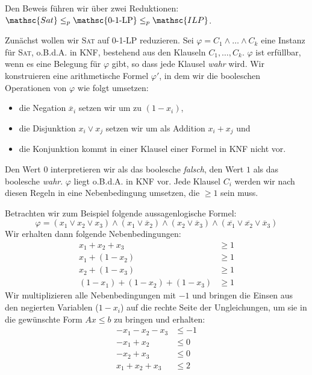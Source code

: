 \begin{Bew}
  \hspace{\parindent}Den Beweis führen wir über zwei Reduktionen: $\mathsc{Sat} \le_p \operatorname{\mathsc{0-1-LP}} \le_p \mathsc{ILP}$.
  
  Zunächst wollen wir \textsc{Sat} auf \textsc{0-1-LP} reduzieren. Sei $\varphi=C_1 \wedge \ldots \wedge C_k$ eine Instanz für \textsc{Sat}, o.B.d.A. in KNF, bestehend aus den Klauseln $C_1, \ldots, C_k$. $\varphi$ ist erfüllbar, wenn es eine Belegung für $\varphi$ gibt, so dass jede Klausel \textit{wahr} wird. Wir konstruieren eine arithmetische Formel $\varphi'$, in dem wir die booleschen Operationen von $\varphi$ wie folgt umsetzen:
  \begin{itemize}
    \item die Negation $\overline{x}_i$ setzen wir um zu $(1-x_i)$,
    \item die Disjunktion $x_i \vee x_j$ setzen wir um als Addition $x_i + x_j$ und
    \item die Konjunktion kommt in einer Klausel einer Formel in KNF nicht vor.
  \end{itemize}
  Den Wert $0$ interpretieren wir als das boolesche \textit{falsch}, den Wert $1$ als das boolesche \textit{wahr}. $\varphi$ liegt o.B.d.A. in KNF vor. Jede Klausel $C_i$ werden wir nach diesen Regeln in eine Nebenbedingung umsetzen, die $\ge 1$ sein muss.
  
  Betrachten wir zum Beispiel folgende aussagenlogische Formel:
  \[ \varphi = (x_1 \vee x_2 \vee x_3) \wedge (x_1 \vee \overline{x}_2) \wedge (x_2 \vee \overline{x}_3) \wedge (\overline{x_1} \vee \overline{x_2} \vee \overline{x}_3) \]
  Wir erhalten dann folgende Nebenbedingungen:
  \begin{align*}
    x_1 + x_2 + x_3 & \ge 1\\
    x_1 + (1 - x_2) & \ge 1\\
    x_2 + (1 - x_3) & \ge 1\\
    (1 - x_1) + (1 - x_2) + (1 - x_3) & \ge 1
  \end{align*}
  Wir multiplizieren alle Nebenbedingungen mit $-1$ und bringen die Einsen aus den negierten Variablen ($1 - x_i$) auf die rechte Seite der Ungleichungen, um sie in die gewünschte Form $Ax \le b$ zu bringen und erhalten:
  \begin{align*}
      - x_1 - x_2 - x_3 & \le -1\\
      - x_1 + x_2 & \le 0\\
      - x_2 + x_3 & \le 0\\
      x_1 + x_2 + x_3 & \le 2
  \end{align*}
  

\end{Bew}
